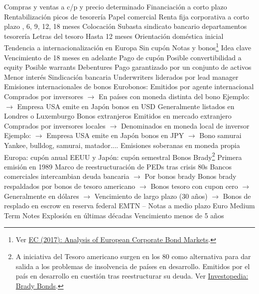 \documentclass{nuevotema}
\begin{document}
\begin{esquemal}
				\4 Compras y ventas a c/p y precio determinado
				\4 Financiación a corto plazo
				\4 Rentabilización picos de tesorería
			\3 Papel comercial
				\4 Renta fija corporativa a corto plazo
				, 6, 9, 12, 18 meses
				\4 Colocación
				\4[] Subasta
				\4[] sindicato bancario
				\4[] departamentos tesorería
			\3 Letras del tesoro
				\4 Hasta 12 meses
				\4 Orientación doméstica inicial
				\4 Tendencia a internacionalización en Europa
				\4 Sin cupón
		\2 Notas y bonos\footnote{Ver \href{https://ec.europa.eu/transparency/regexpert/index.cfm?do=groupDetail.groupDetailDoc&id=35768&no=1}{EC (2017): Analysis of European Corporate Bond Markets}.}
			\3 Idea clave
				\4 Vencimiento de 18 meses en adelante
				\4 Pago de cupón
				\4 Posible convertibilidad a equity
				\4 Posible warrants
				\4 Debentures
				\4[] Pago garantizado por un conjunto de activos
				\4[] Menor interés
				\4 Sindicación bancaria
				\4 Underwriters liderados por lead manager
			\3 Emisiones internacionales de bonos
				\4 Eurobonos:
				\4[] Emitidos por agente internacional
				\4[] Comprados por inversores
				\4[] $\to$ En países con moneda distinta del bono
				\4[] Ejemplo:
				\4[] $\to$ Empresa USA emite en Japón bonos en USD
				\4[] Generalmente listados en Londres o Luxemburgo
				\4 Bonos extranjeros
				\4[] Emitidos en mercado extranjero
				\4[] Comprados por inversores locales
				\4[] $\to$ Denominados en moneda local de inversor
				\4[] Ejemplo:
				\4[] $\to$ Empresa USA emite en Japón bonos en JPY
				\4[] $\to$ Bono samurai
				\4[] Yankee, bulldog, samurai, matador....
				\4 Emisiones soberanas en moneda propia
				\4[] Europa: cupón anual
				\4[] EEUU y Japón: cupón semestral
				\4 Bonos Brady\footnote{A iniciativa del Tesoro americano surgen en los 80 como alternativa para dar salida a los problemas de insolvencia de países en desarrollo. Emitidos por el país en desarrollo en cuestión tras reestructurar su deuda. Ver \href{https://www.investopedia.com/terms/b/bradybonds.asp}{Investopedia: Brady Bonds}.}
				\4[] Primera emisión en 1989
				\4[] Marco de reestructuración de PEDs tras crisis 80s
				\4[] Bancos comerciales intercambian deuda bancaria
				\4[] $\to$ Por bonos brady
				\4[] Bonos brady respaldados por bonos de tesoro americano
				\4[] $\to$ Bonos tesoro con cupon cero
				\4[] $\to$ Generalmente en dólares
				\4[] $\to$ Vencimiento de largo plazo (30 años)
				\4[] $\to$ Bonos de resplado en escrow en reserva federal
			\3 EMTN -- Notas a medio plazo
				\4 Euro Medium Term Notes
				\4 Explosión en últimas décadas
				\4 Vencimiento menos de 5 años

\end{esquemal}
\end{document}
